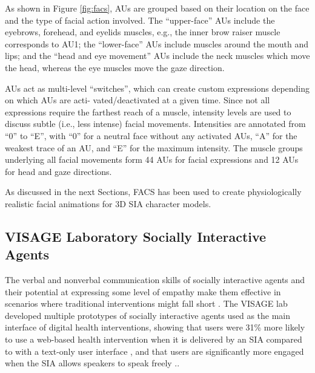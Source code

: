 \documentclass[12pt]{article}
\begin{document}
As shown in Figure \ref{fig:facs}, AUs
are grouped based on their location on the face and the
type of facial action involved. The “upper-face” AUs include
the eyebrows, forehead, and eyelids muscles, e.g., the inner
brow raiser muscle corresponds to AU1; the “lower-face”
AUs include muscles around the mouth and lips; and the
“head and eye movement” AUs include the neck muscles
which move the head, whereas the eye muscles move the
gaze direction.

AUs act as multi-level “switches”, which can create
custom expressions depending on which AUs are acti-
vated/deactivated at a given time. Since not all expressions
require the farthest reach of a muscle, intensity levels are
used to discuss subtle (i.e., less intense) facial movements.
Intensities are annotated from “0” to “E”, with “0” for a
neutral face without any activated AUs, “A” for the weakest
trace of an AU, and “E” for the maximum intensity.
The muscle groups underlying all facial movements
form 44 AUs for facial expressions and 12 AUs for head
and gaze directions.  

As discussed in the next Sections, FACS has been used to create physiologically realistic facial animations for 3D SIA character models.


\subsection{VISAGE Laboratory Socially Interactive Agents}

The verbal and nonverbal communication skills  of  socially interactive agents and their potential at expressing some level of empathy make them effective in scenarios where traditional interventions might fall short \cite{Lisetti2013}.  
The VISAGE lab developed multiple prototypes of socially interactive agents used as the main interface of digital health interventions, showing that users were  31\% more likely to use a web-based health intervention when it is delivered by an SIA compared to with a text-only user interface \cite{Lisetti2013}, and that users are significantly more engaged when the SIA allows speakers to speak freely \cite{LisettiNowExperience}.\cite{Yasavur2014}. 
\end{document}

